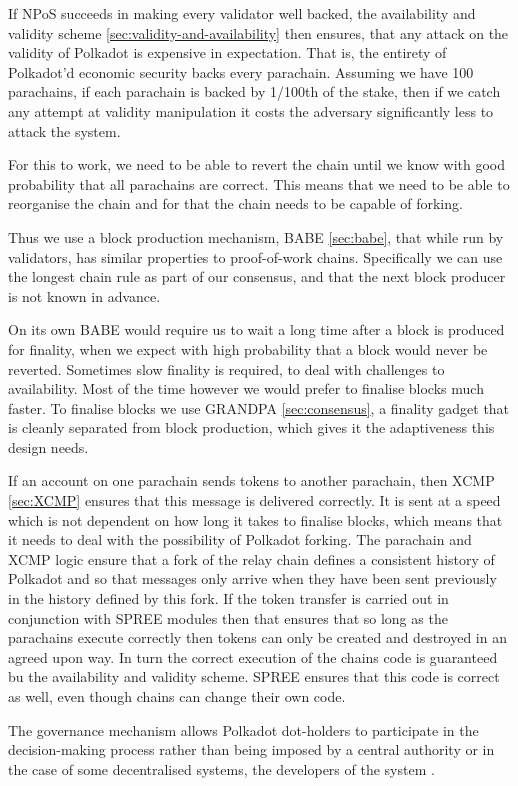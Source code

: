 If NPoS succeeds in making every validator well backed, the availability and validity scheme \ref{sec:validity-and-availability} then ensures, that any attack on the validity of Polkadot is expensive in expectation. That is, the entirety of Polkadot'd economic security backs every parachain. Assuming we have 100 parachains, if each parachain is backed by 1/100th of the stake, then if we catch any attempt at validity manipulation it costs the adversary significantly less to attack the system.  

For this to work, we need to be able to revert the chain until we know with good probability that all parachains are correct. This means that we need to be able to reorganise the chain and for that the chain needs to be capable of forking.

Thus we use a block production mechanism, BABE \ref{sec:babe}, that while run by validators, has similar properties to proof-of-work chains. Specifically we can use the longest chain rule as part of our consensus, and that the next block producer is not known in advance.

On its own BABE would require us to wait a long time after a block is produced for finality, when we expect with high probability that a block would never be reverted. Sometimes slow finality is required, to deal with challenges to availability. Most of the time however we would prefer to finalise blocks much faster.  To finalise blocks we use GRANDPA \ref{sec:consensus}, a finality gadget that is cleanly separated from block production, which gives it the adaptiveness this design needs. 

If an account on one parachain sends tokens to another parachain, then XCMP \ref{sec:XCMP} ensures that this message is delivered correctly. It is sent at a speed which is not dependent on how long it takes to finalise blocks, which means that it needs to deal with the possibility of Polkadot forking. The parachain and XCMP logic ensure that a fork of the relay chain defines a consistent history of Polkadot and so that messages only arrive when they have been sent previously in the history defined by this fork. If the token transfer is carried out in conjunction with SPREE modules then that ensures that so long as the parachains execute correctly then tokens can only be created and destroyed in an agreed upon way. In turn the correct execution of the chains code is guaranteed bu the availability and validity scheme. SPREE ensures that this code is correct as well, even though chains can change their own code.

The governance mechanism allows Polkadot dot-holders to participate in the decision-making process rather than being imposed by a central authority or in the case of some decentralised systems, the developers of the system .  

